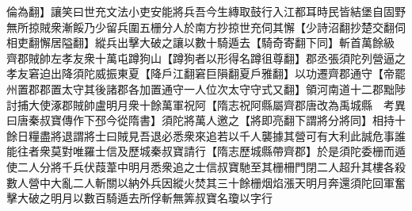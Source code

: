 倫為翻】讓笑曰世充文法小吏安能將兵吾今生縳取鼓行入江都耳時民皆結堡自固野無所掠賊衆漸餒乃少留兵圍五栅分人於南方抄掠世充伺其懈【少詩沼翻抄楚交翻伺相吏翻懈居隘翻】縱兵出擊大破之讓以數十騎遁去【騎奇寄翻下同】斬首萬餘級　齊郡賊帥左孝友衆十萬屯蹲狗山【蹲狗者以形得名蹲徂尊翻】郡丞張須陀列營逼之孝友窘迫出降須陀威振東夏【降戶江翻窘巨隕翻夏戶雅翻】以功遷齊郡通守【帝罷州置郡郡置太守其後諸郡各加置通守一人位次太守守式又翻】領河南道十二郡黜陟討捕大使涿郡賊帥盧明月衆十餘萬軍祝阿【隋志祝阿縣屬齊郡唐改為禹城縣　考異曰唐秦叔寶傳作下邳今從隋書】須陀將萬人邀之【將即亮翻下謂將分將同】相持十餘日糧盡將退謂將士曰賊見吾退必悉衆來追若以千人襲據其營可有大利此誠危事誰能往者衆莫對唯羅士信及歷城秦叔寶請行【隋志歷城縣帶齊郡】於是須陀委栅而遁使二人分將千兵伏葭葦中明月悉衆追之士信叔寶馳至其栅柵門閉二人超升其樓各殺數人營中大亂二人斬關以納外兵因縱火焚其三十餘栅烟焰漲天明月奔還須陀回軍奮擊大破之明月以數百騎遁去所俘斬無筭叔寶名瓊以字行

